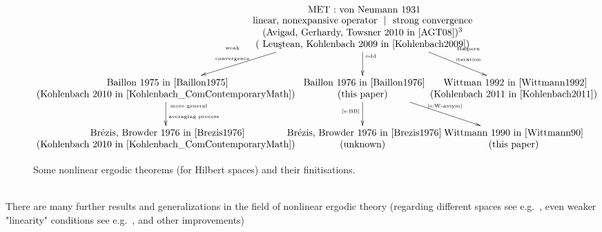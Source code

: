 \begin{figure}[htb]%
\[
\begin{xy}
  \xymatrix@C=-50pt@M=3pt{
  		  & \txt{ MET : von Neumann  1931 \\ linear, nonexpansive operator $\ |\ $ strong convergence\\(Avigad, Gerhardy, Towsner 2010 in~\cite{AGT08})\footnotemark\\ ( Leu{\c{s}}tean, Kohlenbach 2009 in~\cite{Kohlenbach2009})
 		  } \ar[dl]_-{\txt{\tiny weak\\\tiny convergence}} \ar[d]^{\txt{\tiny odd}} \ar[dr]^-{\txt{\tiny $ $\hspace{2ex} Halpern\\ \tiny $ $\hspace{2ex} iteration}} &  \\
        \txt{ 					Baillon 1975 in~\cite{Baillon1975} \\ (Kohlenbach 2010 in~\cite{Kohlenbach_ComContemporaryMath})} \ar[d]^{\txt{\tiny more general\hspace{5ex}$ $\\ \vspace{-7pt}\tiny averaging process}} &  
        \txt{ Baillon 1976 in~\cite{Baillon1976} \\ (this paper) } \ar[d]_{\txt{\tiny \eqref{e:BB}}} \ar[dr]^{\txt{\tiny \eqref{e:W-assym}}} &  
        \txt{ Wittman 1992 in~\cite{Wittmann1992} \\ (Kohlenbach 2011 in~\cite{Kohlenbach2011})}        \\
         \txt{ Br\'ezis, Browder 1976 in~\cite{Brezis1976} \\ (Kohlenbach 2010 in~\cite{Kohlenbach_ComContemporaryMath}) }  & \txt{ Br\'ezis, Browder 1976 in~\cite{Brezis1976} \\ (unknown) } & \txt{Wittmann 1990 in~\cite{Wittmann90} \\ (this paper)} &   
   }
\end{xy}
\]
\caption{Some nonlinear ergodic theorems (for Hilbert spaces) and their finitisations.}%
\label{f:METtree}
\end{figure}
 \\					
There are many further results and generalizations
in the field of nonlinear ergodic theory 
(regarding different spaces see e.g.~\cite{Bruck1979,Hirano1982}, even weaker "linearity" conditions see e.g.~\cite{Miyadera1997,Rouhani2001}, and other improvements) 

